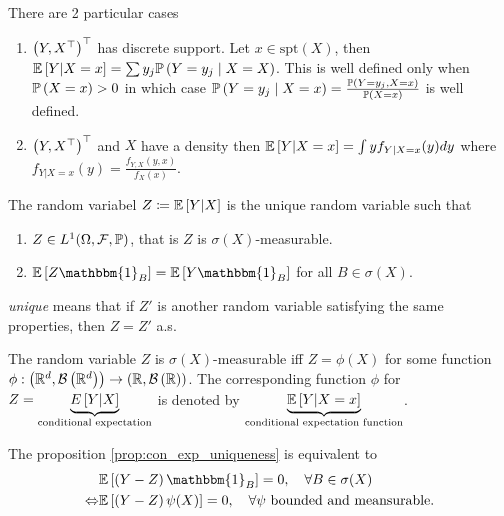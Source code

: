 There are 2 particular cases
\begin{enumerate}
    \item $\left(Y,X^\top\right)^\top$ has discrete support. Let $x\in \text{spt}(X)$, then $\mathbb{E}\left[Y|X=x\right]=\sum y_j \mathbb{P}\left(Y=y_j\mid X=X\right)$. This is well defined only when $\mathbb{P}\left(X=x\right)>0$ in which case $\mathbb{P}\left(Y=y_j\mid X=x\right)=\frac{\mathbb{P}\left(Y=y_j,X=x\right)}{\mathbb{P}\left(X=x\right)}$ is well defined.
    \item $\left(Y,X^\top\right)^\top$ and $X$ have a density then $\mathbb{E}\left[Y|X=x\right]=\int yf_{Y|X=x}(y)dy$ where $f_{Y|X=x}(y)=\frac{f_{Y,X}(y,x)}{f_X(x)}$.
\end{enumerate}
\begin{proposition}
    The random variabel $Z \coloneqq \mathbb{E}\left[Y|X\right]$ is the unique random variable such that
    \begin{enumerate}
        \item $Z\in L^1(\Omega, \mathcal{F}, \mathbb{P})$, that is $Z$ is $\sigma(X)$-measurable.
        \item \label{prop:con_exp_uniqueness}$\E\bra{Z\mathbbm{1}_B}=\E\bra{Y\mathbbm{1}_B}$ for all $B\in \sigma(X)$.
    \end{enumerate}
    \emph{unique} means that if $Z'$ is another random variable satisfying the same properties, then $Z=Z'$ a.s.
\end{proposition}
\begin{remark}
    The random variable $Z$ is $\sigma(X)$-measurable iff $Z=\phi(X)$ for some function $\phi:\left(\mathbb{R}^d,\mathcal{B}\left(\mathbb{R}^d\right)\right)\to\left(\mathbb{R},\mathcal{B}\left(\mathbb{R}\right)\right)$. The corresponding function $\phi$ for $Z=\underbrace{E\left[Y|X\right]}_{\text{conditional expectation}}$ is denoted by $\underbrace{\mathbb{E}\left[Y|X=x\right]}_\text{conditional expectation function}$.
\end{remark}
\begin{remark}
    The proposition \ref{prop:con_exp_uniqueness} is equivalent to 
    \begin{align*}
        &\E\bra{\pa{Y-Z}\mathbbm{1}_B}=0, \quad \forall B\in \sigma(X) \\ \Leftrightarrow &\E\bra{\pa{Y-Z}\psi(X)}=0, \quad \forall \psi\ \text{bounded and meansurable}.
    \end{align*}
\end{remark}
